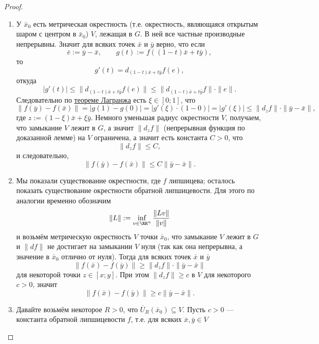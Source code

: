 \documentclass[12pt,a4paper]{article}
\begin{document}
\begin{proof}
        \begin{enumerate}
            \item У $\bar{x}_0$ есть метрическая окрестность (т.е. окрестность, являющаяся открытым шаром с центром в $\bar{x}_0$) $V$, лежащая в $G$. В ней все частные производные непрерывны. Значит для всяких точек $\bar{x}$ и $\bar{y}$ верно, что если
                \[\bar{e} := \bar{y} - \bar{x}, \qquad g(t) := f((1-t)\bar{x} + t\bar{y}),\]
                то
                \[g'(t) = d_{(1-t)\bar{x} + t\bar{y}}f(e),\]
                откуда
                \[
                    |g'(t)|
                    \leqslant \|d_{(1-t)\bar{x} + t\bar{y}}f(e)\|
                    \leqslant \|d_{(1-t)\bar{x} + t\bar{y}}f\| \cdot \|e\|.
                \]
                Следовательно по {\hyperref[Lagrange-theorem]{теореме Лагранжа}} есть $\xi \in [0; 1]$, что
                \[
                    \|f(\bar{y}) - f(\bar{x})\|
                    = |g(1) - g(0)|
                    = |g'(\xi) \cdot (1 - 0)|
                    = |g'(\xi)|
                    \leqslant \|d_zf\| \cdot \|\bar{y} - \bar{x}\|,
                \]
                где $z := (1-\xi)\bar{x} + \xi\bar{y}$. Немного уменьшая радиус окрестности $V$, получаем, что замыкание $V$ лежит в $G$, а значит $\|d_zf\|$ (непрерывная функция по доказанной лемме) на $V$ ограничена, а значит есть константа $C > 0$, что
                \[\|d_zf\| \leqslant C,\]
                и следовательно,
                \[\|f(\bar{y}) - f(\bar{x})\| \leqslant C \|\bar{y} - \bar{x}\|.\]
            \item Мы показали существование окрестности, где $f$ липшицева; осталось показать существование окрестности обратной липшицевости. Для этого по аналогии временно обозначим
                \[\|L\| := \inf_{v \in \RR^n} \frac{\|Lv\|}{\|v\|}\]
                и возьмём метрическую окрестность $V$ точки $\bar{x}_0$, что замыкание $V$ лежит в $G$ и $\|df\|$ не достигает на замыкании $V$ нуля (так как она непрерывна, а значение в $\bar{x}_0$ отлично от нуля). Тогда для всяких точек $\bar{x}$ и $\bar{y}$
                \[\|f(\bar{x}) - f(\bar{y})\| \geqslant \|d_zf\| \cdot \|\bar{y} - \bar{x}\|\]
                для некоторой точки $z \in [x; y]$. При этом $\|d_zf\| \geqslant c$ в $V$ для некоторого $c > 0$, значит
                \[\|f(\bar{x}) - f(\bar{y})\| \geqslant c \|\bar{y} - \bar{x}\|.\]
            \item Давайте возьмём некоторое $R > 0$, что $\overline{U}_R(\bar{x}_0) \subseteq V$. Пусть $c > 0$ --- константа обратной липшицевости $f$, т.е. для всяких $\bar{x}, \bar{y} \in V$

\end{enumerate}
\end{proof}
\end{document}
